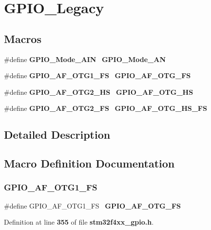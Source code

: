 \section{G\+P\+I\+O\+\_\+\+Legacy}
\label{group__GPIO__Legacy}
\subsection*{Macros}
\begin{DoxyCompactItemize}
\item 
\#define \textbf{ G\+P\+I\+O\+\_\+\+Mode\+\_\+\+A\+IN}~\textbf{ G\+P\+I\+O\+\_\+\+Mode\+\_\+\+AN}
\item 
\#define \textbf{ G\+P\+I\+O\+\_\+\+A\+F\+\_\+\+O\+T\+G1\+\_\+\+FS}~\textbf{ G\+P\+I\+O\+\_\+\+A\+F\+\_\+\+O\+T\+G\+\_\+\+FS}
\item 
\#define \textbf{ G\+P\+I\+O\+\_\+\+A\+F\+\_\+\+O\+T\+G2\+\_\+\+HS}~\textbf{ G\+P\+I\+O\+\_\+\+A\+F\+\_\+\+O\+T\+G\+\_\+\+HS}
\item 
\#define \textbf{ G\+P\+I\+O\+\_\+\+A\+F\+\_\+\+O\+T\+G2\+\_\+\+FS}~\textbf{ G\+P\+I\+O\+\_\+\+A\+F\+\_\+\+O\+T\+G\+\_\+\+H\+S\+\_\+\+FS}
\end{DoxyCompactItemize}


\subsection{Detailed Description}


\subsection{Macro Definition Documentation}
\mbox{\label{group__GPIO__Legacy_gaddd737997abcd1154c0998b22333b579}} 
\subsubsection{G\+P\+I\+O\+\_\+\+A\+F\+\_\+\+O\+T\+G1\+\_\+\+FS}
{\footnotesize\ttfamily \#define G\+P\+I\+O\+\_\+\+A\+F\+\_\+\+O\+T\+G1\+\_\+\+FS~\textbf{ G\+P\+I\+O\+\_\+\+A\+F\+\_\+\+O\+T\+G\+\_\+\+FS}}



Definition at line \textbf{ 355} of file \textbf{ stm32f4xx\+\_\+gpio.\+h}.

